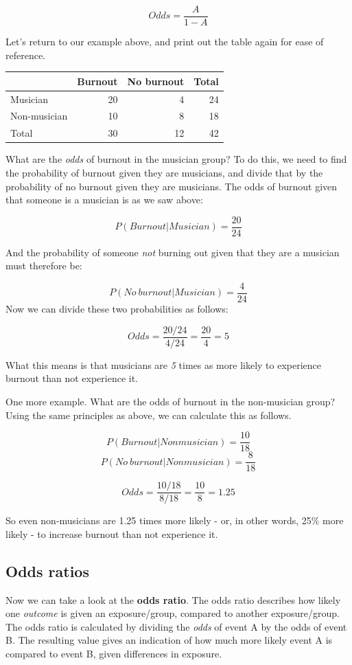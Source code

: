 \documentclass[
]{book}
\begin{document}
\[
Odds = \frac{A}{1-A}
\]

Let's return to our example above, and print out the table again for ease of reference.

\begin{tabular}{l|r|r|r}
\hline
 & Burnout & No burnout & Total\\
\hline
Musician & 20 & 4 & 24\\
\hline
Non-musician & 10 & 8 & 18\\
\hline
Total & 30 & 12 & 42\\
\hline
\end{tabular}

What are the \emph{odds} of burnout in the musician group? To do this, we need to find the probability of burnout given they are musicians, and divide that by the probability of no burnout given they are musicians. The odds of burnout given that someone is a musician is as we saw above:

\[
P(Burnout | Musician) = \frac{20}{24}
\]

And the probability of someone \emph{not} burning out given that they are a musician must therefore be:

\[
P(No \ burnout | Musician) = \frac{4}{24}
\]
Now we can divide these two probabilities as follows:

\[
Odds = \frac{20/24}{4/24} = \frac{20}{4} = 5
\]

What this means is that musicians are \emph{5} times as more likely to experience burnout than not experience it.

One more example. What are the odds of burnout in the non-musician group? Using the same principles as above, we can calculate this as follows.

\[
P(Burnout | Nonmusician) = \frac{10}{18}
\]
\[
P(No \ burnout | Nonmusician) = \frac{8}{18}
\]

\[
Odds = \frac{10/18}{8/18} = \frac{10}{8} = 1.25
\]

So even non-musicians are 1.25 times more likely - or, in other words, 25\% more likely - to increase burnout than not experience it.

\subsection{Odds ratios}\label{odds-ratios}

Now we can take a look at the \textbf{odds ratio}. The odds ratio describes how likely one \emph{outcome} is given an exposure/group, compared to another exposure/group. The odds ratio is calculated by dividing the \emph{odds} of event A by the odds of event B. The resulting value gives an indication of how much more likely event A is compared to event B, given differences in exposure.
\end{document}
